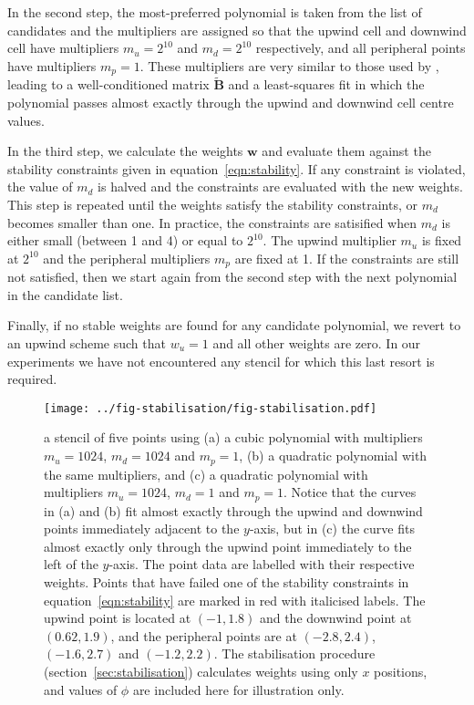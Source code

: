In the second step, the most-preferred polynomial is taken from the list of candidates and the multipliers are assigned so that the upwind cell and downwind cell have multipliers $m_u = 2^{10}$ and $m_d = 2^{10}$ respectively, and all peripheral points have multipliers $m_p = 1$.  These multipliers are very similar to those used by \citep{lashley2002}, leading to a well-conditioned matrix $\mathbf{\tilde{B}}$ and a least-squares fit in which the polynomial passes almost exactly through the upwind and downwind cell centre values.

In the third step, we calculate the weights $\mathbf{w}$ and evaluate them against the stability constraints given in equation~\eqref{eqn:stability}.  If any constraint is violated, the value of $m_d$ is halved and the constraints are evaluated with the new weights.  This step is repeated until the weights satisfy the stability constraints, or $m_d$ becomes smaller than one.  In practice, the constraints are satisified when $m_d$ is either small (between 1 and 4) or equal to $2^{10}$.  The upwind multiplier $m_u$ is fixed at $2^{10}$ and the peripheral multipliers $m_p$ are fixed at \num{1}.  If the constraints are still not satisfied, then we start again from the second step with the next polynomial in the candidate list. 

Finally, if no stable weights are found for any candidate polynomial, we revert to an upwind scheme such that $w_u = 1$ and all other weights are zero.  In our experiments we have not encountered any stencil for which this last resort is required.

\begin{figure}
	\centering
	\texttt{[image: ../fig-stabilisation/fig-stabilisation.pdf]}
%
	\caption{ a stencil of five points using (a) a cubic polynomial with multipliers $m_u = 1024$, $m_d = 1024$ and $m_p = 1$, (b) a quadratic polynomial with the same multipliers, and (c) a quadratic polynomial with multipliers $m_u = 1024$, $m_d = 1$ and $m_p = 1$.  Notice that the curves in (a) and (b) fit almost exactly through the upwind and downwind points immediately adjacent to the $y$-axis, but in (c) the curve fits almost exactly only through the upwind point immediately to the left of the $y$-axis.  The point data are labelled with their respective weights.  Points that have failed one of the stability constraints in equation~\eqref{eqn:stability} are marked in red with italicised labels.  The upwind point is located at $(-1, 1.8)$ and the downwind point at $(0.62, 1.9)$, and the peripheral points are at $(-2.8, 2.4)$, $(-1.6, 2.7)$ and $(-1.2, 2.2)$.  The stabilisation procedure (section~\ref{sec:stabilisation}) calculates weights using only $x$ positions, and values of $\phi$ are included here for illustration only.}
	\label{fig:oscillatory1D}
\end{figure}

